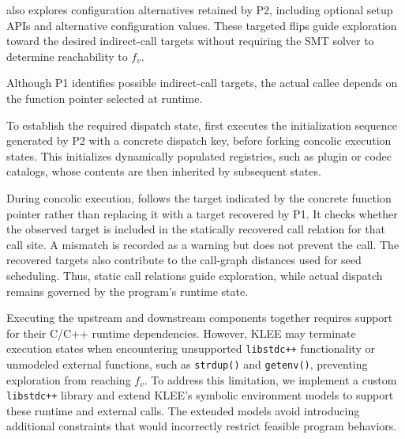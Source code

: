 \sys also explores configuration alternatives retained by P2, including optional setup APIs and alternative configuration values.
These targeted flips guide exploration toward the desired indirect-call targets without requiring the SMT solver to determine reachability to $f_v$.

Although P1 identifies possible indirect-call targets, the actual callee depends on the function pointer selected at runtime.
%

To establish the required dispatch state, \sys first executes the initialization sequence generated by P2 with a concrete dispatch key, before forking concolic execution states.
%
This initializes dynamically populated registries, such as plugin or codec catalogs, whose contents are then inherited by subsequent states.

During concolic execution, \sys follows the target indicated by the concrete function pointer rather than replacing it with a target recovered by P1.
It checks whether the observed target is included in the statically recovered call relation for that call site.
A mismatch is recorded as a warning but does not prevent the call.
The recovered targets also contribute to the call-graph distances used for seed scheduling.
Thus, static call relations guide exploration, while actual dispatch remains governed by the program's runtime state.


Executing the upstream and downstream components together requires support for their C/C++ runtime dependencies.
%
However, KLEE may terminate execution states when encountering unsupported \texttt{libstdc++} functionality or unmodeled external functions, such as \texttt{strdup()} and \texttt{getenv()}, preventing exploration from reaching $f_v$.
%
To address this limitation, we implement a custom \texttt{libstdc++} library and extend KLEE's symbolic environment models to support these runtime and external calls.
The extended models avoid introducing additional constraints that would incorrectly restrict feasible program behaviors.

